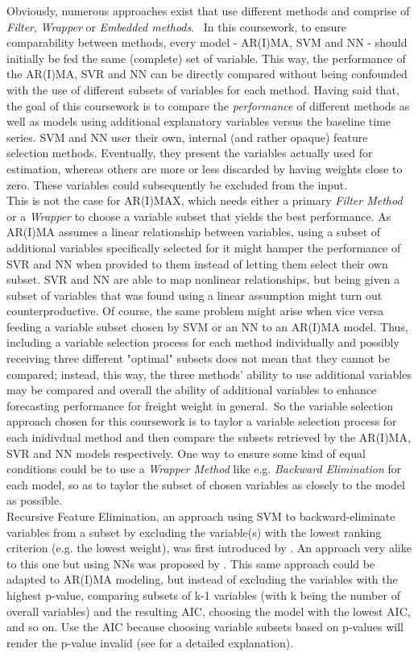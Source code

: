 \documentclass[a4paper, 11pt]{article}
\begin{document}
Obviously, numerous approaches exist that use different methods and comprise of \textit{Filter}, \textit{Wrapper} or \textit{Embedded methods}. \
In this coursework, to ensure comparability between methods, every model - AR(I)MA, SVM and NN - should initially be fed the same (complete) set of variable. This way, the performance of the AR(I)MA, SVR and NN can be directly compared without being confounded with the use of different subsets of variables for each method. 
Having said that, the goal of this coursework is to compare the \textit{performance} of different methods as well as models using additional explanatory variables versus the baseline time series. SVM and NN user their own, internal (and rather opaque) feature selection methods. Eventually, they present the variables actually used for estimation, whereas others are more or less discarded by having weights close to zero. These variables could subsequently be excluded from the input.\\
This is not the case for AR(I)MAX, which needs either a primary \textit{Filter Method} or a \textit{Wrapper} to choose a variable subset that yields the best performance.  
As AR(I)MA assumes a linear relationship between variables, using  a subset of additional variables specifically selected for it might hamper the performance of SVR and NN when provided to them instead of letting them select their own subset. SVR and NN are able to map nonlinear relationships, but being given a subset of variables that was found using a linear assumption might turn out counterproductive. Of course, the same problem might arise when vice versa feeding a variable subset chosen by SVM or an NN to an AR(I)MA model. Thus, including a variable selection process for each method individually and possibly receiving three different "optimal" subsets does not mean that they cannot be compared; instead, this way, the three methods' ability to use additional variables may be compared and overall the ability of additional variables to enhance forecasting performance for freight weight in general.\
So the variable selection approach chosen for this coursework is to taylor a variable selection process for each inidivdual method and then compare the subsets retrieved by the AR(I)MA, SVR and NN models respectively. One way to ensure some kind of equal conditions could be to use a \textit{Wrapper Method} like e.g. \textit{Backward Elimination} for each model, so as to taylor the subset of chosen variables as closely to the model as possible.\\
Recursive Feature Elimination, an approach using SVM to backward-eliminate variables from a subset by excluding the variable(s) with the lowest ranking criterion (e.g. the lowest weight), was first introduced by \cite{Guyon.2002}. An approach very alike to this one but using NNs was proposed by \cite{Castellano.2000}. This same approach could be adapted to AR(I)MA modeling, but instead of excluding the variables with the highest p-value, comparing subsets of k-1 variables (with k being the number of overall variables) and the resulting AIC, choosing the model with the lowest AIC, and so on. Use the AIC because choosing variable subsets based on p-values will render the p-value invalid (see \cite{Heinze.2018} for a detailed explanation).\\
\end{document}
